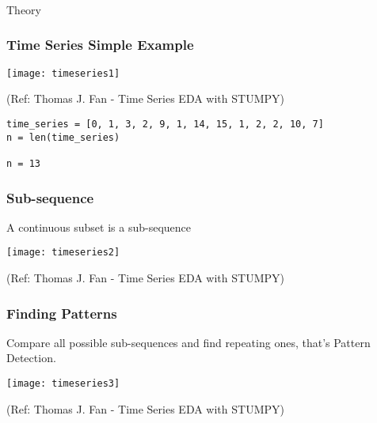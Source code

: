 \begin{frame}[fragile]\frametitle{}
\begin{center}
{\Large Theory}
\end{center}
\end{frame}

\begin{frame}[fragile]\frametitle{Time Series Simple Example}
      \begin{center}
        \texttt{[image: timeseries1]}

		{\tiny (Ref: Thomas J. Fan - Time Series EDA with STUMPY)}		
        \end{center}
	
\begin{lstlisting}
time_series = [0, 1, 3, 2, 9, 1, 14, 15, 1, 2, 2, 10, 7]
n = len(time_series)

n = 13
\end{lstlisting}	
\end{frame}

\begin{frame}[fragile]\frametitle{Sub-sequence}

A continuous subset is a sub-sequence

      \begin{center}
        \texttt{[image: timeseries2]}

		{\tiny (Ref: Thomas J. Fan - Time Series EDA with STUMPY)}		
        \end{center}
	

\end{frame}

\begin{frame}[fragile]\frametitle{Finding Patterns}

Compare all possible sub-sequences and find repeating ones, that's Pattern Detection.

      \begin{center}
        \texttt{[image: timeseries3]}

		{\tiny (Ref: Thomas J. Fan - Time Series EDA with STUMPY)}		
        \end{center}
	

\end{frame}

